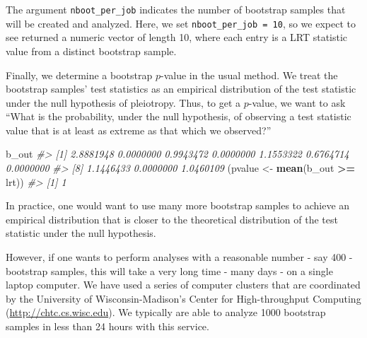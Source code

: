 \documentclass[oneside]{book}\usepackage[]{graphicx}\usepackage[]{color}
\newenvironment{Shaded}{\begin{snugshade}}{\end{snugshade}}
\newcommand{\CommentTok}[1]{\textcolor[rgb]{0.56,0.35,0.01}{\textit{#1}}}
\newcommand{\DataTypeTok}[1]{\textcolor[rgb]{0.13,0.29,0.53}{#1}}
\newcommand{\DecValTok}[1]{\textcolor[rgb]{0.00,0.00,0.81}{#1}}
\newcommand{\KeywordTok}[1]{\textcolor[rgb]{0.13,0.29,0.53}{\textbf{#1}}}
\newcommand{\NormalTok}[1]{#1}
\newcommand{\OperatorTok}[1]{\textcolor[rgb]{0.81,0.36,0.00}{\textbf{#1}}}
\newcommand{\StringTok}[1]{\textcolor[rgb]{0.31,0.60,0.02}{#1}}
\begin{document}
\begin{Shaded}
\end{Shaded}

The argument \texttt{nboot\_per\_job} indicates the number of bootstrap
samples that will be created and analyzed. Here, we set
\texttt{nboot\_per\_job\ =\ 10}, so we expect to see returned a numeric
vector of length 10, where each entry is a LRT statistic value from a
distinct bootstrap sample.

Finally, we determine a bootstrap $p$-value in the usual method. We treat
the bootstrap samples' test statistics as an empirical distribution of
the test statistic under the null hypothesis of pleiotropy. Thus, to get
a $p$-value, we want to ask ``What is the probability, under the null
hypothesis, of observing a test statistic value that is at least as
extreme as that which we observed?''

\begin{Shaded}
\begin{Highlighting}[]
\NormalTok{b_out}
\CommentTok{#>  [1] 2.8881948 0.0000000 0.9943472 0.0000000 1.1553322 0.6764714 0.0000000}
\CommentTok{#>  [8] 1.1446433 0.0000000 1.0460109}
\NormalTok{(pvalue <-}\StringTok{ }\KeywordTok{mean}\NormalTok{(b_out }\OperatorTok{>=}\StringTok{ }\NormalTok{lrt))}
\CommentTok{#> [1] 1}
\end{Highlighting}
\end{Shaded}

In practice, one would want to use many more bootstrap samples to
achieve an empirical distribution that is closer to the theoretical
distribution of the test statistic under the null hypothesis.

However, if one wants to perform analyses with a reasonable number - say
400 - bootstrap samples, this will take a very long time - many days -
on a single laptop computer. We have used a series of computer clusters
that are coordinated by the University of Wisconsin-Madison's Center for
High-throughput Computing (\url{http://chtc.cs.wisc.edu}). We typically
are able to analyze 1000 bootstrap samples in less than 24 hours with
this service.
\end{document}
